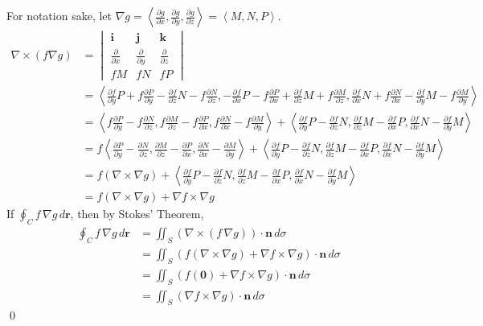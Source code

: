 \documentclass{article}
\newcommand{\lrp}[1]{\left( #1 \right)}
\newcommand{\lra}[1]{\left\langle #1 \right\rangle}
\renewcommand{\i}[0]{\mathbf{{i}}}
\renewcommand{\j}[0]{\mathbf{{j}}}
\renewcommand{\k}[0]{\mathbf{{k}}}
\renewcommand{\r}[0]{\mathbf{r}}
\newcommand{\n}[0]{\mathbf{n}}
\begin{document}
For notation sake, let $\displaystyle \nabla g =\lra{\frac{\partial g}{\partial x}, \frac{\partial g}{\partial y}, \frac{\partial g}{\partial z}}=\lra{M, N, P}$.
\begin{align*}
    \nabla \times \lrp{f\nabla g}&=\begin{vmatrix}\i & \j & \k\\
    \frac{\partial }{\partial x}&\frac{\partial }{\partial y}&\frac{\partial }{\partial z}\\
   f M&fN&fP\end{vmatrix}\tag{$f$ is a scalar function}\\
   &=\lra{\frac{\partial f}{\partial y}P+f\frac{\partial P}{\partial y}-\frac{\partial f}{\partial z}N-f\frac{\partial N}{\partial z},-\frac{\partial f}{\partial x}P-f\frac{\partial P}{\partial x}+\frac{\partial f}{\partial z}M + f\frac{\partial M}{\partial z},\frac{\partial f}{\partial x}N+f\frac{\partial N}{\partial x}-\frac{\partial f}{\partial y}M-f\frac{\partial M}{\partial y}}\\
   &=\lra{f\frac{\partial P}{\partial y}-f\frac{\partial N}{\partial z}, f\frac{\partial M}{\partial z}-f\frac{\partial P}{\partial x}, f\frac{\partial N}{\partial x}-f\frac{\partial M}{\partial y}}+\lra{\frac{\partial f}{\partial y}P-\frac{\partial f}{\partial z}N, \frac{\partial f}{\partial z}M-\frac{\partial f}{\partial x}P, \frac{\partial f}{\partial x}N - \frac{\partial f}{\partial y}M}\\
   &=f\lra{\frac{\partial P}{\partial y}-\frac{\partial N}{\partial z}, \frac{\partial M}{\partial z}-\frac{\partial P}{\partial x}, \frac{\partial N}{\partial x}-\frac{\partial M}{\partial y}}+\lra{\frac{\partial f}{\partial y}P-\frac{\partial f}{\partial z}N, \frac{\partial f}{\partial z}M-\frac{\partial f}{\partial x}P, \frac{\partial f}{\partial x}N - \frac{\partial f}{\partial y}M}\tag{$f$ is a scalar function}\\
   &=f\lrp{\nabla \times \nabla g}+\lra{\frac{\partial f}{\partial y}P-\frac{\partial f}{\partial z}N, \frac{\partial f}{\partial z}M-\frac{\partial f}{\partial x}P, \frac{\partial f}{\partial x}N - \frac{\partial f}{\partial y}M}\tag{see Homework 22, Problem 1(b)}\\
   &=f\lrp{\nabla \times \nabla g}+\nabla f \times \nabla g\tag{try finding $\nabla f \times \nabla g$ yourself to check}
\end{align*}
If $\displaystyle \oint_C f\,\nabla g\,d\r$, then by Stokes' Theorem,
\begin{align*}
    \oint_C f\,\nabla g\,d\r&=\iint_S \lrp{\nabla \times \lrp{f\,\nabla g}}\cdot\n\,d\sigma\\
    &=\iint_S \lrp{f\lrp{\nabla \times \nabla g }+ \nabla f \times \nabla g}\cdot \n\,d\sigma\tag{we just found what $\nabla \times\lrp{f\nabla g}$ is}\\
    &=\iint_S \lrp{f\lrp{\mathbf{0}}+\nabla f\times \nabla g}\cdot \n\,d\sigma\tag{see HW 21, Problem 1(c)}\\
    &=\iint_S \lrp{\nabla f \times \nabla g}\cdot \n \,d\sigma
\end{align*}
\qed
\end{document}

